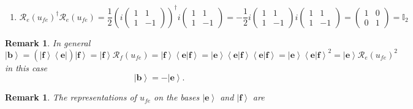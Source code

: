 \documentclass[aps,preprint]{revtex4}
\newtheorem{remark}[theorem]{Remark}
\begin{document}
\begin{enumerate}
\item 
\begin{equation}
\mathcal{R}_{e}\left( u_{fe}\right) ^{\dagger }\mathcal{R}_{e}\left(
u_{fe}\right) =\frac{1}{2}\left( i\left( 
\begin{array}{cc}
1 & 1 \\ 
1 & -1%
\end{array}%
\right) \right) ^{\dagger }i\left( 
\begin{array}{cc}
1 & 1 \\ 
1 & -1%
\end{array}%
\right) =-\frac{1}{2}i\left( 
\begin{array}{cc}
1 & 1 \\ 
1 & -1%
\end{array}%
\right) i\left( 
\begin{array}{cc}
1 & 1 \\ 
1 & -1%
\end{array}%
\right) =\left( 
\begin{array}{cc}
1 & 0 \\ 
0 & 1%
\end{array}%
\right) =\mathbb{I}_{2}
\end{equation}
\end{enumerate}

\begin{remark}
In general%
\begin{equation}
\left\vert \boldsymbol{b}\right\rangle =\left( \overset{}{\left\vert 
\boldsymbol{f}\right\rangle \left\langle \boldsymbol{e}\right\vert }\right)
\left\vert \boldsymbol{f}\right\rangle =\left\vert \boldsymbol{f}%
\right\rangle \mathcal{R}_{f}\left( u_{fe}\right) =\left\vert \boldsymbol{f}%
\right\rangle \left\langle \left. \boldsymbol{e}\right\vert \boldsymbol{f}%
\right\rangle =\left\vert \boldsymbol{e}\right\rangle \left\langle \left. 
\boldsymbol{e}\right\vert \boldsymbol{f}\right\rangle \left\langle \left. 
\boldsymbol{e}\right\vert \boldsymbol{f}\right\rangle =\left\vert 
\boldsymbol{e}\right\rangle \left\langle \left. \boldsymbol{e}\right\vert 
\boldsymbol{f}\right\rangle ^{2}=\left\vert \boldsymbol{e}\right\rangle 
\mathcal{R}_{e}\left( u_{fe}\right) ^{2}
\end{equation}%
in this case 
\begin{equation}
\left\vert \boldsymbol{b}\right\rangle =-\left\vert \boldsymbol{e}%
\right\rangle .
\end{equation}
\end{remark}

\begin{remark}
The representations of $u_{fe}$ on the bases $\left\vert \boldsymbol{e}%
\right\rangle $ and $\left\vert \boldsymbol{f}\right\rangle $ are
\end{remark}
\end{document}
